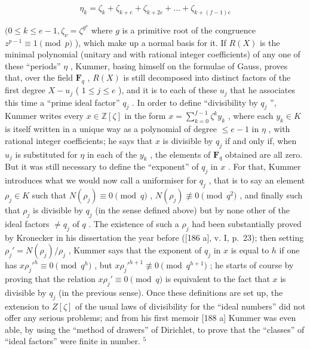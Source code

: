 \[
\eta_ {k} = \zeta_ {k} + \zeta_ {k + e} + \zeta_ {k + 2 e} + \dots + \zeta_ {k + (f - 1) e}
\]

\((0 \leq k \leq e - 1, \zeta_{\nu} = \zeta^{g^{\nu}}\) where \(g\) is a primitive root of the congruence \(z^{p-1} \equiv 1 \pmod{p}\) ), which make up a normal basis for it. If \(R(X)\) is the minimal polynomial (unitary and with rational integer coefficients) of any one of these ``periods'' \(\eta\) , Kummer, basing himself on the formulae of Gauss, proves that, over the field \(\mathbf{F}_{q}\) , \(R(X)\) is still decomposed into distinct factors of the first degree \(X - u_{j}\) ( \(1 \leq j \leq e\) ), and it is to each of these \(u_{j}\) that he associates this time a ``prime ideal factor'' \(q_{j}\) . In order to define ``divisibility by \(q_{j}\) '', Kummer writes every \(x \in \mathbb{Z}[\zeta]\) in the form \(x = \sum_{k=0}^{f-1} \zeta^{k} y_{k}\) , where each \(y_{k} \in K\) is itself written in a unique way as a polynomial of degree \(\leq e-1\) in \(\eta\) , with rational integer coefficients; he says that \(x\) is divisible by \(q_{j}\) if and only if, when \(u_{j}\) is substituted for \(\eta\) in each of the \(y_{k}\) , the elements of \(\mathbf{F}_{q}\) obtained are all zero. But it was still necessary to define the ``exponent'' of \(q_{j}\) in \(x\) . For that, Kummer introduces what we would now call a uniformiser for \(q_{j}\) , that is to say an element \(\rho_{j} \in K\) such that \(N(\rho_{j}) \equiv 0 \pmod{q}\) , \(N(\rho_{j}) \not\equiv 0 \pmod{q^{2}}\) , and finally such that \(\rho_{j}\) is divisible by \(q_{j}\) (in the sense defined above) but by none other of the ideal factors \(\neq q_{j}\) of \(q\) . The existence of such a \(\rho_{j}\) had been substantially proved by Kronecker in his dissertation the year before ({[}186 a{]}, v. I, p.~23); then setting \(\rho_{j}' = N(\rho_{j}) / \rho_{j}\) , Kummer says that the exponent of \(q_{j}\) in \(x\) is equal to \(h\) if one has \(x\rho_{j}'^{h} \equiv 0 \pmod{q^{h}}\) , but \(x\rho_{j}'^{h+1} \not\equiv 0 \pmod{q^{h+1}}\) ; he starts of course by proving that the relation \(x\rho_{j}' \equiv 0 \pmod{q}\) is equivalent to the fact that \(x\) is divisible by \(q_{j}\) (in the previous sense). Once these definitions are set up, the extension to \(Z[\zeta]\) of the usual laws of divisibility for the ``ideal numbers'' did not offer any serious problems; and from his first memoir {[}188 a{]} Kummer was even able, by using the ``method of drawers'' of Dirichlet, to prove that the ``classes'' of ``ideal factors'' were finite in number. \(^{5}\)

